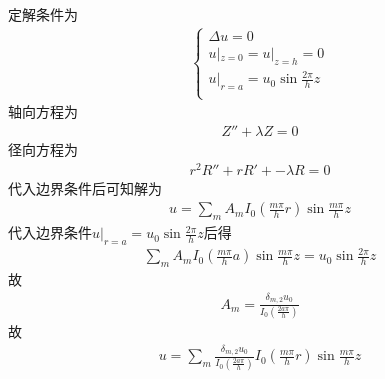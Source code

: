 \documentclass{phyasgn}
\begin{document}
\begin{sol}[4]
    定解条件为
    \begin{align*}
        \left\{
        \begin{matrix}
            \Delta u=0\\
            u|_{z=0}=u|_{z=h}=0\\
            u|_{r=a}=u_0\sin\frac{2\pi}{h}z\\
        \end{matrix}
        \right.
    \end{align*}
    轴向方程为
    \begin{align*}
        Z''+\lambda Z=0
    \end{align*}
    径向方程为
    \begin{align*}
        r^2R''+rR'+-\lambda R=0
    \end{align*}
    代入边界条件后可知解为
    \begin{align}
        u=\sum_{m}A_mI_0(\frac{m\pi}{h}r)\sin\frac{m\pi}{h}z
    \end{align}
    代入边界条件$u|_{r=a}=u_0\sin\frac{2\pi}{h}z$后得
    \begin{align*}
        \sum_{m}A_mI_0(\frac{m\pi}{h}a)\sin\frac{m\pi}{h}z=u_0\sin\frac{2\pi}{h}z
    \end{align*}
    故\begin{align*}
        A_m=\frac{\delta_{m,2}u_0}{I_0(\frac{2a\pi}{h})}
    \end{align*}
    故
    \begin{align*}
        u=\sum_{m}\frac{\delta_{m,2}u_0}{I_0(\frac{2a\pi}{h})}I_0(\frac{m\pi}{h}r)\sin\frac{m\pi}{h}z
    \end{align*}
    
\end{sol}\par
\end{document}
